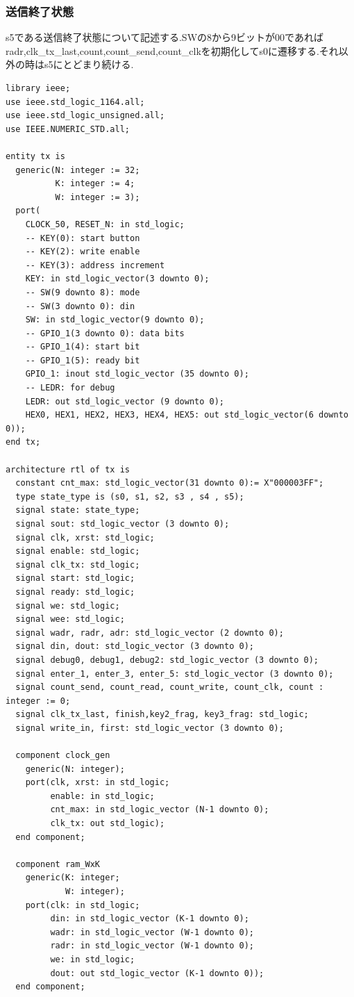 \documentclass[dvipdfmx]{jarticle}
\begin{document}
\subsubsection{送信終了状態}
s5である送信終了状態について記述する.SWの8から9ビットが00であればradr,clk\_tx\_last,count,count\_send,count\_clkを初期化してs0に遷移する.それ以外の時はs5にとどまり続ける.
\begin{lstlisting}[caption=送信回路のコード,label=fuga]
library ieee;
use ieee.std_logic_1164.all;
use ieee.std_logic_unsigned.all;
use IEEE.NUMERIC_STD.all;

entity tx is
  generic(N: integer := 32;
          K: integer := 4;
          W: integer := 3);
  port(
    CLOCK_50, RESET_N: in std_logic;
    -- KEY(0): start button
    -- KEY(2): write enable
    -- KEY(3): address increment
    KEY: in std_logic_vector(3 downto 0);
    -- SW(9 downto 8): mode
    -- SW(3 downto 0): din
    SW: in std_logic_vector(9 downto 0);
    -- GPIO_1(3 downto 0): data bits
    -- GPIO_1(4): start bit
    -- GPIO_1(5): ready bit
    GPIO_1: inout std_logic_vector (35 downto 0);
    -- LEDR: for debug
    LEDR: out std_logic_vector (9 downto 0);
    HEX0, HEX1, HEX2, HEX3, HEX4, HEX5: out std_logic_vector(6 downto 0));
end tx;

architecture rtl of tx is
  constant cnt_max: std_logic_vector(31 downto 0):= X"000003FF";
  type state_type is (s0, s1, s2, s3 , s4 , s5);
  signal state: state_type;
  signal sout: std_logic_vector (3 downto 0);
  signal clk, xrst: std_logic;
  signal enable: std_logic;
  signal clk_tx: std_logic;
  signal start: std_logic;
  signal ready: std_logic;
  signal we: std_logic;
  signal wee: std_logic;
  signal wadr, radr, adr: std_logic_vector (2 downto 0);
  signal din, dout: std_logic_vector (3 downto 0);
  signal debug0, debug1, debug2: std_logic_vector (3 downto 0);
  signal enter_1, enter_3, enter_5: std_logic_vector (3 downto 0);
  signal count_send, count_read, count_write, count_clk, count : integer := 0;
  signal clk_tx_last, finish,key2_frag, key3_frag: std_logic;
  signal write_in, first: std_logic_vector (3 downto 0);
  
  component clock_gen
    generic(N: integer);
    port(clk, xrst: in std_logic;
         enable: in std_logic;
         cnt_max: in std_logic_vector (N-1 downto 0);
         clk_tx: out std_logic);
  end component;
  
  component ram_WxK
    generic(K: integer;
            W: integer);
    port(clk: in std_logic;
         din: in std_logic_vector (K-1 downto 0);
         wadr: in std_logic_vector (W-1 downto 0);
         radr: in std_logic_vector (W-1 downto 0);
         we: in std_logic;
         dout: out std_logic_vector (K-1 downto 0));
  end component;
  

\end{lstlisting}
\end{document}
